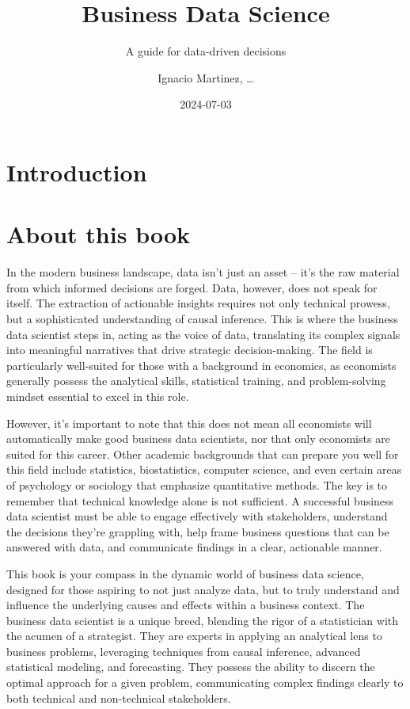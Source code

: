 \documentclass[
  letterpaper,
  DIV=11,
  numbers=noendperiod]{scrreprt}
\title{Business Data Science}
\subtitle{A guide for data-driven decisions}
\author{Ignacio Martinez, \ldots{}}
\date{2024-07-03}
\renewcommand*\contentsname{Table of contents}
\newcommand\contentsname{Table of contents}
\begin{document}
\maketitle

\renewcommand*\contentsname{Table of contents}
{
\hypersetup{linkcolor=}
\setcounter{tocdepth}{2}
\tableofcontents
}
\part{Introduction}

\part{About this book}

In the modern business landscape, data isn't just an asset -- it's the
raw material from which informed decisions are forged. Data, however,
does not speak for itself. The extraction of actionable insights
requires not only technical prowess, but a sophisticated understanding
of causal inference. This is where the business data scientist steps in,
acting as the voice of data, translating its complex signals into
meaningful narratives that drive strategic decision-making. The field is
particularly well-suited for those with a background in economics, as
economists generally possess the analytical skills, statistical
training, and problem-solving mindset essential to excel in this role.

However, it's important to note that this does not mean all economists
will automatically make good business data scientists, nor that only
economists are suited for this career. Other academic backgrounds that
can prepare you well for this field include statistics, biostatistics,
computer science, and even certain areas of psychology or sociology that
emphasize quantitative methods. The key is to remember that technical
knowledge alone is not sufficient. A successful business data scientist
must be able to engage effectively with stakeholders, understand the
decisions they're grappling with, help frame business questions that can
be answered with data, and communicate findings in a clear, actionable
manner.

This book is your compass in the dynamic world of business data science,
designed for those aspiring to not just analyze data, but to truly
understand and influence the underlying causes and effects within a
business context. The business data scientist is a unique breed,
blending the rigor of a statistician with the acumen of a strategist.
They are experts in applying an analytical lens to business problems,
leveraging techniques from causal inference, advanced statistical
modeling, and forecasting. They possess the ability to discern the
optimal approach for a given problem, communicating complex findings
clearly to both technical and non-technical stakeholders.
\end{document}
